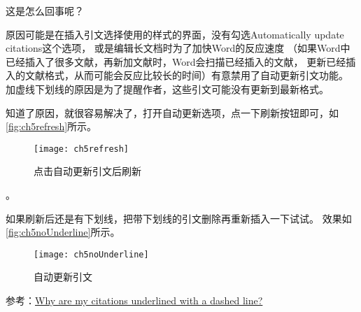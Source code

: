 \documentclass[cn,11pt,chinese]{elegantbook}
\begin{document}
			这是怎么回事呢？
			
			原因可能是在插入引文选择使用的样式的界面，没有勾选Automatically update citations这个选项，
			或是编辑长文档时为了加快Word的反应速度
			（如果Word中已经插入了很多文献，再新加文献时，Word会扫描已经插入的文献，
			更新已经插入的文献格式，从而可能会反应比较长的时间）有意禁用了自动更新引文功能。
			加虚线下划线的原因是为了提醒作者，这些引文可能没有更新到最新格式。
			
			知道了原因，就很容易解决了，打开自动更新选项，点一下刷新按钮即可，如\autoref{fig:ch5refresh}所示。
				\begin{figure}[htbp]
					\centering
					\texttt{[image: ch5refresh]}
					\caption{点击自动更新引文后刷新}
					\label{fig:ch5refresh}
				\end{figure}。
			
			
			如果刷新后还是有下划线，把带下划线的引文删除再重新插入一下试试。		
			效果如\autoref{fig:ch5noUnderline}所示。
				\begin{figure}[htbp]
					\centering
					\texttt{[image: ch5noUnderline]}
					\caption{自动更新引文}
					\label{fig:ch5noUnderline}
				\end{figure}
			
			
			参考：\href{https://www.zotero.org/support/kb/citations_underlined}{Why are my citations underlined with a dashed line?}
\end{document}
